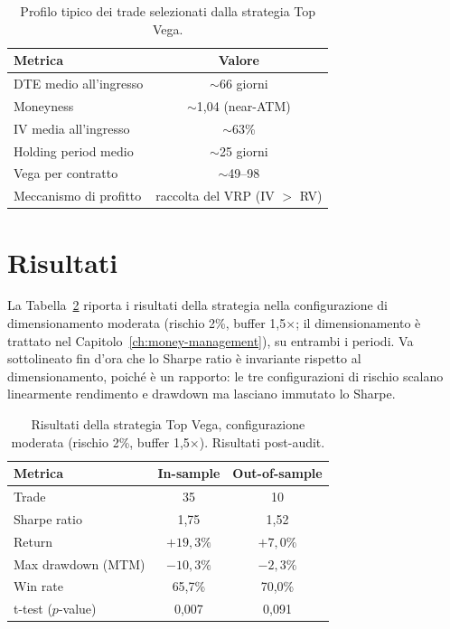 \begin{table}[H]
\centering
\caption{Profilo tipico dei trade selezionati dalla strategia Top Vega.}
\label{tab:profilo-trade}
\begin{tabular}{lc}
\toprule
\textbf{Metrica} & \textbf{Valore} \\
\midrule
DTE medio all'ingresso & $\sim$66 giorni \\
Moneyness & $\sim$1,04 (near-ATM) \\
IV media all'ingresso & $\sim$63\% \\
Holding period medio & $\sim$25 giorni \\
Vega per contratto & $\sim$49--98 \\
Meccanismo di profitto & raccolta del VRP (IV $>$ RV) \\
\bottomrule
\end{tabular}
\end{table}

\section{Risultati}
\label{sec:strategia-risultati}

La Tabella~\ref{tab:risultati-principali} riporta i risultati della
strategia nella configurazione di dimensionamento moderata (rischio 2\%,
buffer 1,5$\times$; il dimensionamento è trattato nel
Capitolo~\ref{ch:money-management}), su entrambi i periodi. Va sottolineato
fin d'ora che lo Sharpe ratio è invariante rispetto al dimensionamento,
poiché è un rapporto: le tre configurazioni di rischio scalano linearmente
rendimento e drawdown ma lasciano immutato lo Sharpe.

\begin{table}[H]
\centering
\caption{Risultati della strategia Top Vega, configurazione moderata
(rischio 2\%, buffer 1,5$\times$). Risultati post-audit.}
\label{tab:risultati-principali}
\begin{tabular}{lcc}
\toprule
\textbf{Metrica} & \textbf{In-sample} & \textbf{Out-of-sample} \\
\midrule
Trade & 35 & 10 \\
Sharpe ratio & 1,75 & 1,52 \\
Return & $+19{,}3\%$ & $+7{,}0\%$ \\
Max drawdown (MTM) & $-10{,}3\%$ & $-2{,}3\%$ \\
Win rate & 65,7\% & 70,0\% \\
t-test ($p$-value) & 0,007 & 0,091 \\
\bottomrule
\end{tabular}
\end{table}

